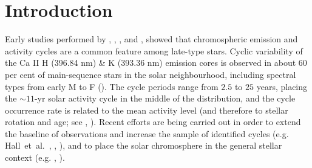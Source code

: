 \documentclass[a4paper,fleqn,usenatbib]{mnras}
\begin{document}

\section{Introduction}\label{sect_1}

Early studies performed by , , , and , showed that chromospheric emission and activity cycles are a common feature among late-type stars. Cyclic variability of the Ca II H (396.84 nm) \& K (393.36 nm) emission cores is observed in about $60$ per cent of main-sequence stars in the solar neighbourhood, including spectral types from early M to F (). The cycle periods range from $2.5$ to $25$ years, placing the $\sim$$11$-yr solar activity cycle in the middle of the distribution, and the cycle occurrence rate is related to the mean activity level (and therefore to stellar rotation and age; see , ). Recent efforts are being carried out in order to extend the baseline of observations and increase the sample of identified cycles (e.g. Hall~et~al.~, , ), and to place the solar chromosphere in the general stellar context (e.g. , ).
\end{document}
